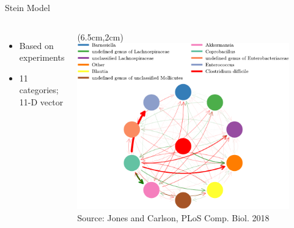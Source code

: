 \documentclass[15pt]{beamer}
\begin{document}
\begin{frame}{Stein Model}
\begin{columns}
\begin{itemize}
	\item Based on experiments
	\item 11 categories; 11-D vector
\end{itemize}

	\begin{textblock*}{6.8cm}(6.5cm,2cm) %
	 \includegraphics[width=0.9\textwidth]{food_web_w_legend_preplos}\\[-1ex]
	 {\tiny Source: Jones and Carlson, PLoS Comp. Biol. 2018}
	\end{textblock*}
\end{columns}
\end{frame}
\end{document}
